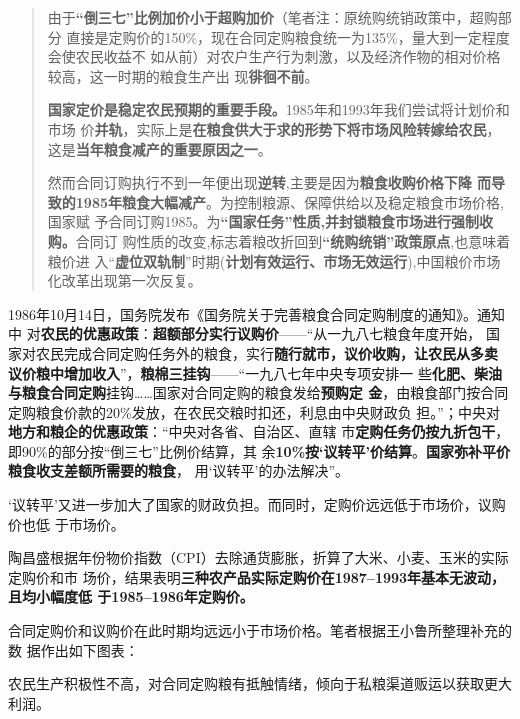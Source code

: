 \begin{quotation}
  由于\textbf{“倒三七”比例加价小于超购加价}（笔者注：原统购统销政策中，超购部分
  直接是定购价的150\%，现在合同定购粮食统一为135\%，量大到一定程度会使农民收益不
  如从前）对农户生产行为刺激，以及经济作物的相对价格较高，这一时期的粮食生产出
  现\textbf{徘徊不前}。\cite{shuangguizhi}

  \textbf{国家定价是稳定农民预期的重要手段。}1985年和1993年我们尝试将计划价和市场
  价\textbf{并轨}，实际上是\textbf{在粮食供大于求的形势下将市场风险转嫁给农民}，
  这是\textbf{当年粮食减产的重要原因之一}。\cite{lumaisg}

  然而合同订购执行不到一年便出现\textbf{逆转},主要是因为\textbf{粮食收购价格下降
    而导致的1985年粮食大幅减产}。为控制粮源、保障供给以及稳定粮食市场价格,国家赋
  予合同订购1985。为\textbf{“国家任务”性质,并封锁粮食市场进行强制收购。}合同订
  购性质的改变,标志着粮改折回到\textbf{“统购统销”政策原点},也意味着粮价进
  入“\textbf{虚位双轨制}”时期(\textbf{计划有效运行、市场无效运行}),中国粮价市场
  化改革出现第一次反复。\cite{liangshi40}
\end{quotation}

1986年10月14日，国务院发布《国务院关于完善粮食合同定购制度的通知》。通知中
对\textbf{农民的优惠政策}：\textbf{超额部分实行议购价}——“从一九八七粮食年度开始，
国家对农民完成合同定购任务外的粮食，实行\textbf{随行就市，议价收购，让农民从多卖
  议价粮中增加收入}”，\textbf{粮棉三挂钩}——“一九八七年中央专项安排一
些\textbf{化肥、柴油与粮食合同定购}挂钩……国家对合同定购的粮食发给\textbf{预购定
  金}，由粮食部门按合同定购粮食价款的20\%发放，在农民交粮时扣还，利息由中央财政负
担。”；中央对\textbf{地方和粮企的优惠政策}：“中央对各省、自治区、直辖
市\textbf{定购任务仍按九折包干}，即90\%的部分按“倒三七”比例价结算，其
余\textbf{10\%按‘议转平’价结算}。\textbf{国家弥补平价粮食收支差额所需要的粮食}，
用‘议转平’的办法解决”。

‘议转平’又进一步加大了国家的财政负担。而同时，定购价远远低于市场价，议购价也低
于市场价。

陶昌盛根据年份物价指数（CPI）去除通货膨胀，折算了大米、小麦、玉米的实际定购价和市
场价，结果表明\textbf{三种农产品实际定购价在1987--1993年基本无波动，且均小幅度低
  于1985--1986年定购价。}\cite{taochangsheng}

合同定购价和议购价在此时期均远远小于市场价格。笔者根据王小鲁所整理补充的数
据\cite{wangxiaoluliangshi}作出如下图表：



农民生产积极性不高，对合同定购粮有抵触情绪，倾向于私粮渠道贩运以获取更大利润。

